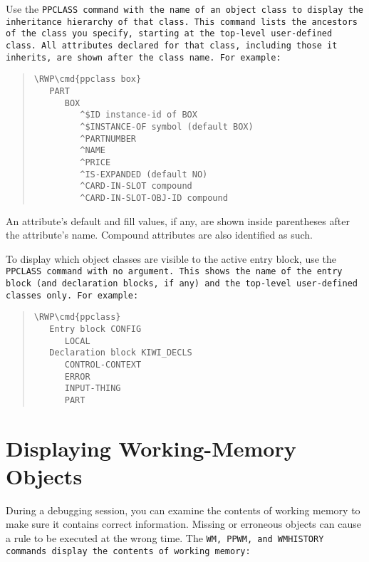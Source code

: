 Use the \tt{PPCLASS} command with the name of an object class to
display the inheritance hierarchy of that class. This command lists
the ancestors of the class you specify, starting at the top-level
user-defined class. All attributes declared for that class, including
those it inherits, are shown after the class name. For example:

\begin{quote}
\begin{Verbatim}[commandchars=\\\{\}]
\RWP\cmd{ppclass box}
   PART
      BOX
         ^$ID instance-id of BOX
         ^$INSTANCE-OF symbol (default BOX)
         ^PARTNUMBER
         ^NAME
         ^PRICE
         ^IS-EXPANDED (default NO)
         ^CARD-IN-SLOT compound
         ^CARD-IN-SLOT-OBJ-ID compound
\end{Verbatim}
\end{quote}

An attribute's default and fill values, if any, are shown inside
parentheses after the attribute's name. Compound attributes are also
identified as such.

To display which object classes are visible to the active entry block,
use the \tt{PPCLASS} command with no argument. This shows the name of the
entry block (and declaration blocks, if any) and the top-level
user-defined classes only. For example:

\begin{quote}
\begin{Verbatim}[commandchars=\\\{\}]
\RWP\cmd{ppclass}
   Entry block CONFIG
      LOCAL
   Declaration block KIWI_DECLS
      CONTROL-CONTEXT
      ERROR
      INPUT-THING
      PART
\end{Verbatim}
\end{quote}

\section{Displaying Working-Memory Objects}

During a debugging session, you can examine the contents of working
memory to make sure it contains correct information.  Missing or
erroneous objects can cause a rule to be executed at the wrong
time. The \tt{WM}, \tt{PPWM}, and \tt{WMHISTORY} commands display the
contents of working memory:


